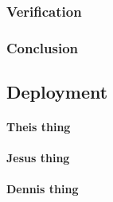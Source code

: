 \subsubsection{Verification}
%
\subsubsection{Conclusion}
\subsection{Deployment}
\paragraph{Theis thing}
%
%
\paragraph{Jesus thing}
%
%
\paragraph{Dennis thing}
%
%